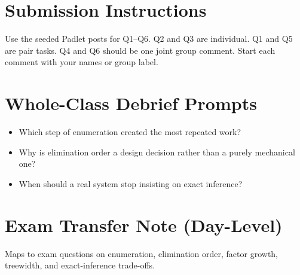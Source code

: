 \documentclass[11pt]{article}
\providecommand{\tightlist}{\setlength{\itemsep}{0pt}\setlength{\parskip}{0pt}}
\begin{document}
\section*{Submission Instructions}

Use the seeded Padlet posts for Q1--Q6. Q2 and Q3 are individual. Q1 and Q5 are pair tasks. Q4 and Q6 should be one joint group comment. Start each comment with your names or group label.

\section*{Whole-Class Debrief Prompts}

\begin{itemize}
\tightlist
\item
  Which step of enumeration created the most repeated work?
\item
  Why is elimination order a design decision rather than a purely mechanical one?
\item
  When should a real system stop insisting on exact inference?
\end{itemize}

\section*{Exam Transfer Note (Day-Level)}

Maps to exam questions on enumeration, elimination order, factor growth, treewidth, and exact-inference trade-offs.
\end{document}
